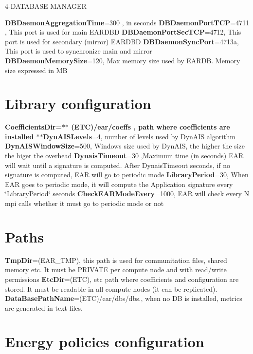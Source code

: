 4-\/\+D\+A\+T\+A\+B\+A\+SE M\+A\+N\+A\+G\+ER

{\bfseries D\+B\+Daemon\+Aggregation\+Time}=300 , in seconds {\bfseries D\+B\+Daemon\+Port\+T\+CP}=4711 , This port is used for main E\+A\+R\+D\+BD {\bfseries D\+B\+Daemon\+Port\+Sec\+T\+CP}=4712, This port is used for secondary (mirror) E\+A\+R\+D\+BD {\bfseries D\+B\+Daemon\+Sync\+Port}=4713a, This port is used to synchronize main and mirror {\bfseries D\+B\+Daemon\+Memory\+Size}=120, Max memory size used by E\+A\+R\+DB. Memory size expressed in MB

\section*{Library configuration}

{\bfseries Coefficients\+Dir=$\ast$$\ast$ (E\+TC)/ear/coeffs , path where coefficients are installed $\ast$$\ast$\+Dyn\+A\+I\+S\+Levels}=4, number of levels used by Dyn\+A\+IS algorithm {\bfseries Dyn\+A\+I\+S\+Window\+Size}=500, Windows size used by Dyn\+A\+IS, the higher the size the higer the overhead {\bfseries Dynais\+Timeout}=30 ,Maximum time (in seconds) E\+AR will wait until a signature is computed. After Dynais\+Timeout seconds, if no signature is computed, E\+AR will go to periodic mode {\bfseries Library\+Period}=30, When E\+AR goes to periodic mode, it will compute the Application signature every \char`\"{}\+Library\+Period\char`\"{} seconds {\bfseries Check\+E\+A\+R\+Mode\+Every}=1000, E\+AR will check every N mpi calls whether it must go to periodic mode or not

\section*{Paths}

{\bfseries Tmp\+Dir}=(E\+A\+R\+\_\+\+T\+MP), this path is used for communitation files, shared memory etc. It must be P\+R\+I\+V\+A\+TE per compute node and with read/write permissions {\bfseries Etc\+Dir}=(E\+TC), etc path where coefficients and configuration are stored. It must be readable in all compute nodes (it can be replicated). {\bfseries Data\+Base\+Path\+Name}=(E\+TC)/ear/dbs/dbs., when no DB is installed, metrics are generated in text files.

\section*{Energy policies configuration}

